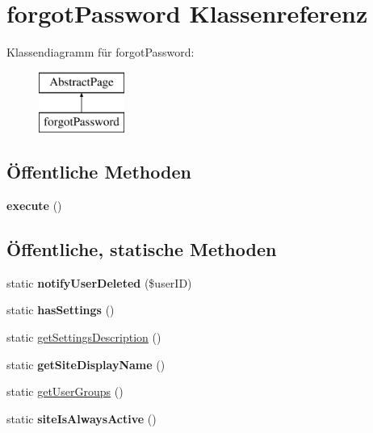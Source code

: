 \hypertarget{classforgot_password}{}\section{forgot\+Password Klassenreferenz}
\label{classforgot_password}
Klassendiagramm für forgot\+Password\+:\begin{figure}[H]
\begin{center}
\leavevmode
\includegraphics[height=2.000000cm]{classforgot_password}
\end{center}
\end{figure}
\subsection*{Öffentliche Methoden}
\begin{DoxyCompactItemize}
\item 
\mbox{\label{classforgot_password_a8d7dcabe774276ac640b6928e3111026}} 
{\bfseries execute} ()
\end{DoxyCompactItemize}
\subsection*{Öffentliche, statische Methoden}
\begin{DoxyCompactItemize}
\item 
\mbox{\label{classforgot_password_a1f1b3ac2c7badf063d121d0dbcc7addc}} 
static {\bfseries notify\+User\+Deleted} (\$user\+ID)
\item 
\mbox{\label{classforgot_password_a155f9b3f2b05ae9cc9aa6bb80e7934c4}} 
static {\bfseries has\+Settings} ()
\item 
static \mbox{\hyperlink{classforgot_password_a7dd67a72bbd73fb11b07f23396b44197}{get\+Settings\+Description}} ()
\item 
\mbox{\label{classforgot_password_af7d8be941f8922d143351c69e5366324}} 
static {\bfseries get\+Site\+Display\+Name} ()
\item 
static \mbox{\hyperlink{classforgot_password_a37c99be6731e040c6059b827d5831497}{get\+User\+Groups}} ()
\item 
\mbox{\label{classforgot_password_ab2ae2963c0c4297762ba25f469be6e17}} 
static {\bfseries site\+Is\+Always\+Active} ()
\end{DoxyCompactItemize}
